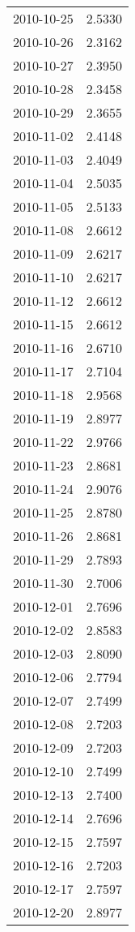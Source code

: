 \begin{tabular}{lr}
2010-10-25 &      2.5330 \\
2010-10-26 &      2.3162 \\
2010-10-27 &      2.3950 \\
2010-10-28 &      2.3458 \\
2010-10-29 &      2.3655 \\
2010-11-02 &      2.4148 \\
2010-11-03 &      2.4049 \\
2010-11-04 &      2.5035 \\
2010-11-05 &      2.5133 \\
2010-11-08 &      2.6612 \\
2010-11-09 &      2.6217 \\
2010-11-10 &      2.6217 \\
2010-11-12 &      2.6612 \\
2010-11-15 &      2.6612 \\
2010-11-16 &      2.6710 \\
2010-11-17 &      2.7104 \\
2010-11-18 &      2.9568 \\
2010-11-19 &      2.8977 \\
2010-11-22 &      2.9766 \\
2010-11-23 &      2.8681 \\
2010-11-24 &      2.9076 \\
2010-11-25 &      2.8780 \\
2010-11-26 &      2.8681 \\
2010-11-29 &      2.7893 \\
2010-11-30 &      2.7006 \\
2010-12-01 &      2.7696 \\
2010-12-02 &      2.8583 \\
2010-12-03 &      2.8090 \\
2010-12-06 &      2.7794 \\
2010-12-07 &      2.7499 \\
2010-12-08 &      2.7203 \\
2010-12-09 &      2.7203 \\
2010-12-10 &      2.7499 \\
2010-12-13 &      2.7400 \\
2010-12-14 &      2.7696 \\
2010-12-15 &      2.7597 \\
2010-12-16 &      2.7203 \\
2010-12-17 &      2.7597 \\
2010-12-20 &      2.8977 \\

\end{tabular}
